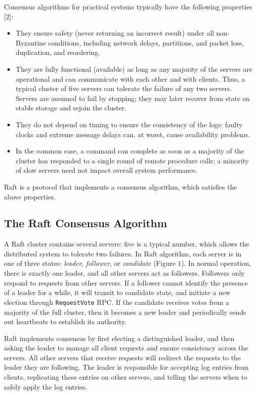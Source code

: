 \documentclass[11pt]{article}
\begin{document}
Consensus algorithms for practical systems typically have the following properties [2]:
\begin{itemize}
    \item They ensure safety (never returning an incorrect result) under all non-Byzantine conditions, including network delays, partitions, and packet loss, duplication, and reordering.
    \item They are fully functional (available) as long as any majority of the servers are operational and can communicate with each other and with clients. Thus, a typical cluster of five servers can tolerate the failure of any two servers. Servers are assumed to fail by stopping; they may later recover from state on stable storage and rejoin the cluster.
    \item They do not depend on timing to ensure the consistency of the logs: faulty clocks and extreme message delays can, at worst, cause availability problems.
    \item In the common case, a command can complete as soon as a majority of the cluster has responded to a single round of remote procedure calls; a minority of slow servers need not impact overall system performance.
\end{itemize}

Raft is a protocol that implements a consensus algorithm, which satisfies the above properties.

\subsection{The Raft Consensus Algorithm}

A Raft cluster contains several servers: five is a typical number, which allows the distributed system to tolerate two failures. In Raft algorithm, each server is in one of three states: \textit{leader}, \textit{follower}, or \textit{candidate} (Figure $1$). In normal operation, there is exactly one leader, and all other servers act as followers. Followers only respond to requests from other servers. If a follower cannot identify the presence of a leader for a while, it will transit to candidate state, and initiate a new election through \texttt{RequestVote} RPC. If the candidate receives votes from a majority of the full cluster, then it becomes a new leader and periodically sends out heartbeats to establish its authority.

Raft implements consensus by first electing a distinguished leader, and then asking the leader to manage all client requests and ensure consistency across the servers. All other servers that receive requests will redirect the requests to the leader they are following. The leader is responsible for accepting log entries from clients, replicating these entries on other servers, and telling the servers when to safely apply the log entries.
\end{document}
